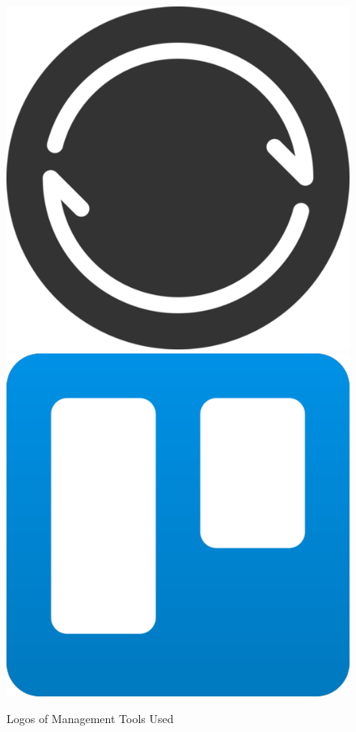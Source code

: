 \begin{figure}[t]
  \includegraphics[height=\managementToolsLogosHeight]{assets/tools/development/resilio.png}
  \includegraphics[height=\managementToolsLogosHeight]{assets/tools/management/trello.png}
  \caption{Logos of Management Tools Used}
  \label{management_tools_logos}
\end{figure}

